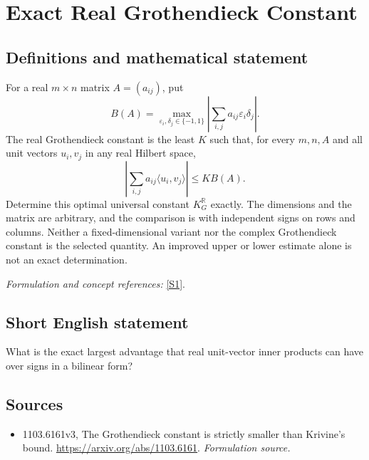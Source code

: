 \documentclass[11pt]{article}
\begin{document}
\section*{\texorpdfstring{Exact Real Grothendieck Constant}{Exact Real Grothendieck Constant}}\label{310}
\subsection{Definitions and mathematical statement}
For a real $m\times n$ matrix $A=(a_{ij})$, put
\[
 B(A)=\max_{{\varepsilon}_i,\delta_j\in\{-1,1\}}
 \left|\sum_{i,j}a_{ij}{\varepsilon}_i\delta_j\right|.
\]
The real Grothendieck constant is the least $K$ such that, for every $m,n,A$ and all unit vectors $u_i,v_j$ in any real Hilbert space,
\[
 \left|\sum_{i,j}a_{ij}\langle u_i,v_j\rangle\right|\le K B(A).
\]
Determine this optimal universal constant $K_G^{{\mathbb{R}}}$ exactly. The dimensions and the matrix are arbitrary, and the comparison is with independent signs on rows and columns. Neither a fixed-dimensional variant nor the complex Grothendieck constant is the selected quantity. An improved upper or lower estimate alone is not an exact determination.
\par\smallskip\textit{Formulation and concept references:} \href{https://arxiv.org/abs/1103.6161}{[S1]}.

\subsection{Short English statement}
What is the exact largest advantage that real unit-vector inner products can have over signs in a bilinear form?
\subsection{Sources}
\begin{itemize}
\item[S1]1103.6161v3, The Grothendieck constant is strictly smaller than Krivine's bound.
\url{https://arxiv.org/abs/1103.6161}.
\textit{Formulation source.}
\end{itemize}
\end{document}
